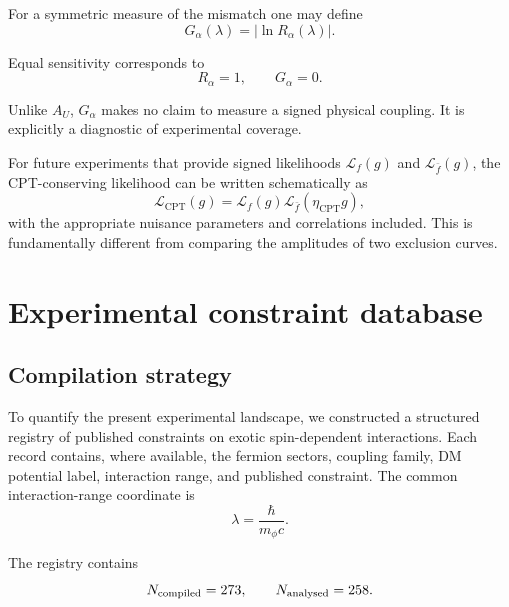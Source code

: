 \documentclass[aps,prd,reprint,superscriptaddress,nofootinbib]{revtex4-2}
\newcommand{\CPT}{\mathrm{CPT}}
\begin{document}
	For a symmetric measure of the mismatch one may define
	\begin{equation}
		G_\alpha(\lambda)
		=
		\left|\ln R_\alpha(\lambda)\right|.
		\label{eq:G}
	\end{equation}
	
	Equal sensitivity corresponds to
	\begin{equation}
		R_\alpha=1,
		\qquad
		G_\alpha=0.
	\end{equation}
	
	Unlike $A_U$, $G_\alpha$ makes no claim to measure a signed physical
	coupling. It is explicitly a diagnostic of experimental coverage.
	
	For future experiments that provide signed likelihoods
	$\mathcal L_f(g)$ and $\mathcal L_{\bar f}(g)$, the CPT-conserving
	likelihood can be written schematically as
	\begin{equation}
		\mathcal L_{\CPT}(g)
		=
		\mathcal L_f(g)
		\mathcal L_{\bar f}(\eta_\CPT g),
	\end{equation}
	with the appropriate nuisance parameters and correlations included.
	This is fundamentally different from comparing the amplitudes of two
	exclusion curves.
	
	\section{Experimental constraint database}
	
	\subsection{Compilation strategy}
	
	To quantify the present experimental landscape, we constructed a
	structured registry of published constraints on exotic spin-dependent
	interactions. Each record contains, where available, the fermion
	sectors, coupling family, DM potential label, interaction range, and
	published constraint. The common interaction-range coordinate is
	\begin{equation}
		\lambda=\frac{\hbar}{m_\phi c}.
	\end{equation}
	
	The registry contains
	\begin{equation}
		N_{\rm compiled}=273,
		\qquad
		N_{\rm analysed}=258.
		\label{eq:Nrecords}
	\end{equation}
	
\end{document}
